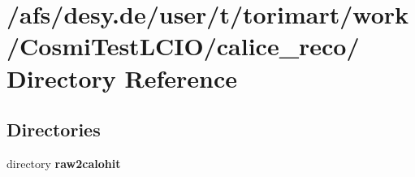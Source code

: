 \section{/afs/desy.de/user/t/torimart/work/CosmiTestLCIO/calice\_\-reco/ Directory Reference}
\label{dir_f98b43a53f5533225f05987ae358305b}
\subsection*{Directories}
\begin{DoxyCompactItemize}
\item 
directory {\bf raw2calohit}
\end{DoxyCompactItemize}
